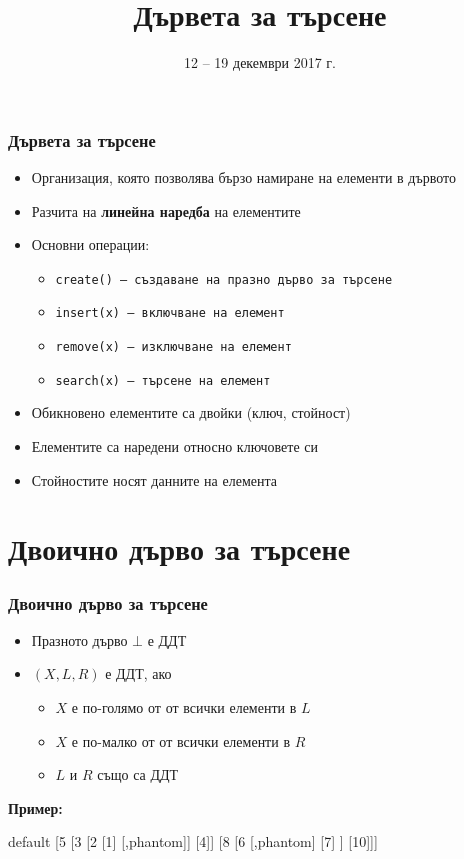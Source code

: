 \documentclass{beamer}
\title{Дървета за търсене}
\date{12 -- 19 декември 2017 г.}
\newcommand{\samplebinordtree}{%
  \begin{forest}
    default [5 [3 [2 [1] [,phantom]] [4]] [8 [6 [,phantom] [7] ] [10]]]
  \end{forest}%
}
\begin{document}
\begin{frame}
  \titlepage
\end{frame}

\begin{frame}
  \frametitle{Дървета за търсене}
  \begin{itemize}
  \item Организация, която позволява бързо намиране на елементи в дървото
  \item Разчита на \textbf{линейна наредба} на елементите
  \item Основни операции:
    \begin{itemize}
    \item \tt{create()} --- създаване на празно дърво за търсене
    \item \tt{insert(x)} --- включване на елемент
    \item \tt{remove(x)} --- изключване на елемент
    \item \tt{search(x)} --- търсене на елемент
    \end{itemize}
  \item Обикновено елементите са двойки (ключ, стойност)
  \item Елементите са наредени относно ключовете си
  \item Стойностите носят данните на елемента
  \end{itemize}
\end{frame}

\section{Двоично дърво за търсене}

\begin{frame}
  \frametitle{Двоично дърво за търсене}
  \begin{definition}
    \begin{itemize}
    \item Празното дърво $\bot$ е ДДТ
    \item $(X,L,R)$ е ДДТ, ако
      \begin{itemize}
      \item $X$ е по-голямо от от всички елементи в $L$
      \item $X$ е по-малко от от всички елементи в $R$
      \item $L$ и $R$ също са ДДТ
      \end{itemize}
    \end{itemize}
  \end{definition}
  \pause
  \textbf{Пример:}
  \vspace{-1em}
  \begin{center}
    \small
    \samplebinordtree
  \end{center}
\end{frame}
\end{document}

